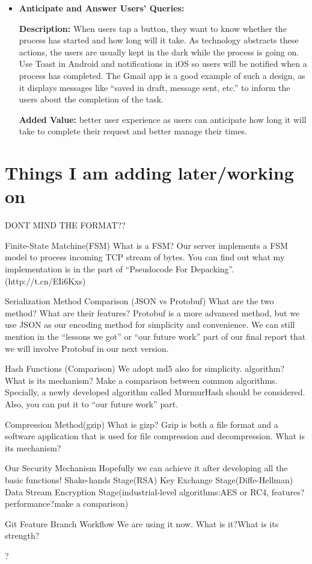 \documentclass{article}
\begin{document}
\begin{itemize}
\item \textbf{Anticipate and Answer Users’ Queries:}

\textbf{Description:} When users tap a button, they want to know whether the process has started and how long will it take. As technology abstracts these actions, the users are usually kept in the dark while the process is going on. Use Toast in Android and notifications in iOS so users will be notified when a process has completed. The Gmail app is a good example of such a design, as it displays messages like “saved in draft, message sent, etc.” to inform the users about the completion of the task.

\textbf{Added Value:} better user experience as users can anticipate how long it will take to complete their request and better manage their times.
\end{itemize}

\section{Things I am adding later/working on}
DONT MIND THE FORMAT??

Finite-State Matchine(FSM)
What is a FSM?
Our server implements a FSM model to process incoming TCP stream of bytes.
You can find out what my implementation is in the part of “Pseudocode For Depacking”. (http://t.cn/EIi6Kxs)

Serialization Method Comparison (JSON vs Protobuf)
What are the two method?
What are their features?
Protobuf is a more advanced method, but we use JSON as our encoding method for simplicity and convenience. We can still mention in the “lessons we got” or “our future work” part of our final report that we will involve Protobuf in our next version.

Hash Functions (Comparison)
We adopt md5 also for simplicity. algorithm?
What is its mechanism?
Make a comparison between common algorithms. Specially, a newly developed algorithm called MurmurHash should be considered. Also, you can put it to “our future work” part.

Compression Method(gzip)
What is gizp?
Gzip is both a file format and a software application that is used for file compression and decompression.
What is its mechanism?


Our Security Mechanism
Hopefully we can achieve it after developing all the basic functions!
Shake-hands Stage(RSA)
Key Exchange Stage(Diffe-Hellman)
Data Stream Encryption Stage(industrial-level algorithms:AES or RC4, features?performance?make a comparison)

Git Feature Branch Workflow
We are using it now. What is it?What is its strength?

?
\end{document}
